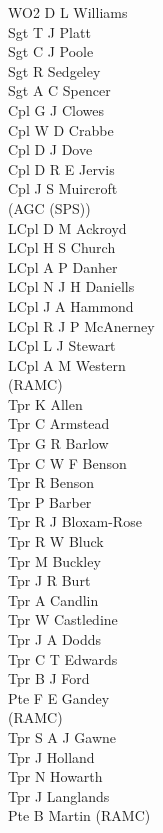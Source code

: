 \begin{multicols}{3}
  \small
  \noindent
  WO2 D L Williams \\
  Sgt T J Platt \\
  Sgt C J Poole \\
  Sgt R Sedgeley \\
  Sgt A C Spencer \\
  Cpl G J Clowes \\
  Cpl W D Crabbe \\
  Cpl D J Dove \\
  Cpl D R E Jervis \\
  Cpl J S Muircroft \\ \indent (AGC (SPS)) \\
  LCpl D M Ackroyd \\
  LCpl H S Church \\
  LCpl A P Danher \\
  LCpl N J H Daniells \\
  LCpl J A Hammond \\
  LCpl R J P McAnerney \\
  LCpl L J Stewart \\
  LCpl A M Western \\ \indent (RAMC) \\
  Tpr K Allen \\
  Tpr C Armstead \\
  Tpr G R Barlow \\
  Tpr C W F Benson \\
  Tpr R Benson \\
  Tpr P Barber \\
  Tpr R J Bloxam-Rose \\
  Tpr R W Bluck \\
  Tpr M Buckley \\
  Tpr J R Burt \\
  Tpr A Candlin \\
  Tpr W Castledine \\
  Tpr J A Dodds \\
  Tpr C T Edwards \\
  Tpr B J Ford \\
  Pte F E Gandey \\ \indent (RAMC) \\
  Tpr S A J Gawne \\
  Tpr J Holland \\
  Tpr N Howarth \\
  Tpr J Langlands \\
  Pte B Martin (RAMC) \\

\end{multicols}
